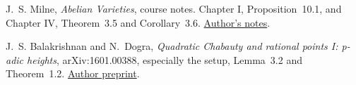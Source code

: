 J.~S. Milne, \emph{Abelian Varieties}, course notes.
Chapter I, Proposition~10.1, and Chapter IV, Theorem~3.5 and
Corollary~3.6. \href{https://www.jmilne.org/math/CourseNotes/AVc.pdf}{Author's notes}.

J.~S. Balakrishnan and N.~Dogra,
\emph{Quadratic Chabauty and rational points I: p-adic heights},
arXiv:1601.00388, especially the setup, Lemma~3.2 and Theorem~1.2.
\href{https://arxiv.org/pdf/1601.00388}{Author preprint}.
